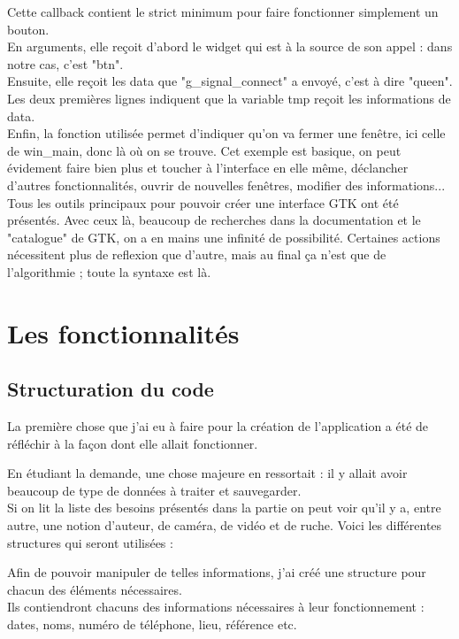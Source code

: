 \documentclass[11pt,french,a4paper]{report}
\begin{document}
Cette callback contient le strict minimum pour faire fonctionner simplement un bouton.\\
En arguments, elle reçoit d'abord le widget qui est à la source de son appel : dans notre cas, c'est "btn". \\
Ensuite, elle reçoit les data que "g\_signal\_connect" a envoyé, c'est à dire "queen". \\

Les deux premières lignes indiquent que la variable tmp reçoit les informations de data. \\
Enfin, la fonction utilisée permet d'indiquer qu'on va fermer une fenêtre, ici celle de win\_main, donc là où on
se trouve. Cet exemple est basique, on peut évidement faire bien plus et toucher à l'interface en elle même, déclancher
d'autres fonctionnalités, ouvrir de nouvelles fenêtres, modifier des informations...\\

Tous les outils principaux pour pouvoir créer une interface GTK ont été présentés. Avec ceux là, beaucoup de recherches
dans la documentation et le "catalogue" %
de GTK, on a en mains une infinité de possibilité. Certaines actions nécessitent plus de reflexion que d'autre, mais 
au final ça n'est que de l'algorithmie ; toute la syntaxe est là. \\


    \section{Les fonctionnalités} 
        \subsection{Structuration du code}

La première chose que j'ai eu à faire pour la création de l'application a été de réfléchir à la façon dont elle allait fonctionner.

En étudiant la demande, une chose majeure en ressortait : il y allait avoir beaucoup de type de données à traiter et sauvegarder. \\
Si on lit la liste des besoins présentés dans la partie %
on peut voir qu'il y a, entre autre, une notion d'auteur, de caméra, de vidéo et de ruche. Voici les différentes structures 
qui seront utilisées : %

Afin de pouvoir manipuler de telles informations, j'ai créé une structure pour chacun des éléments nécessaires. \\
Ils contiendront chacuns des informations nécessaires à leur fonctionnement : dates, noms, numéro de téléphone, lieu, référence etc. \\
\end{document}
